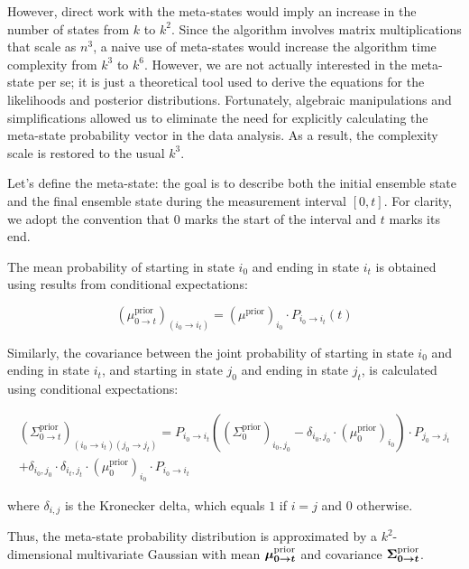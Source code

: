 \documentclass[pdflatex,sn-mathphys-num]{sn-jnl}%
\theoremstyle{thmstyleone}%
\theoremstyle{thmstyletwo}%
\theoremstyle{thmstylethree}%
\begin{document}
However, direct work with the meta-states would imply an increase in the number of states from $k$ to $k^2$. Since the algorithm involves matrix multiplications that scale as $n^3$, a naive use of meta-states would increase the algorithm time complexity from $k^3$ to $k^6$. However, we are not actually interested in the meta-state per se; it is just a theoretical tool used to derive the equations for the likelihoods and posterior distributions. Fortunately, algebraic manipulations and simplifications allowed us to eliminate the need for explicitly calculating the meta-state probability vector in the data analysis. As a result, the complexity scale is restored to the usual $k^3$.


Let's define the meta-state: the goal is to describe both the initial ensemble state and the final ensemble state during the measurement interval \( [0, t] \). For clarity, we adopt the convention that \( 0 \) marks the start of the interval and \( t \) marks its end.

The mean probability of starting in state \( i_0 \) and ending in state \( i_t \) is obtained using results from conditional expectations:

\begin{equation}
	(\mu^{\text{prior}}_{0 \rightarrow t})_{(i_0 \rightarrow i_t)} = (\mu^{\text{prior}})_{i_0} \cdot P_{i_0 \rightarrow i_t}(t)
	\label{eq:meta_mean_prior}
\end{equation}

Similarly, the covariance between the joint probability of starting in state \( i_0 \) and ending in state \( i_t \), and starting in state \( j_0 \) and ending in state \( j_t \), is calculated using conditional expectations:

\begin{multline}
	(\Sigma^{\text{prior}}_{0 \rightarrow t})_{(i_0 \rightarrow i_t)(j_0 \rightarrow j_t)} = 
	P_{i_0 \rightarrow i_t} \left((\Sigma^{\text{prior}}_0)_{i_0, j_0} - \delta_{i_0, j_0} \cdot (\mu^{\text{prior}}_0)_{i_0}\right) \cdot P_{j_0 \rightarrow j_t} \\
	+ \delta_{i_0, j_0} \cdot \delta_{i_t, j_t} \cdot (\mu^{\text{prior}}_0)_{i_0} \cdot P_{i_0 \rightarrow i_t}
	\label{eq:meta_covariance_prior}
\end{multline}

where \( \delta_{i, j} \) is the Kronecker delta, which equals \( 1 \) if \( i = j \) and \( 0 \) otherwise.

Thus, the meta-state probability distribution is approximated by a \( k^2 \)-dimensional multivariate Gaussian with mean \( \boldmath{\mu}^{\text{prior}}_{0 \rightarrow t} \) and covariance \( \boldmath{\Sigma}^{\text{prior}}_{0 \rightarrow t} \).
\end{document}
